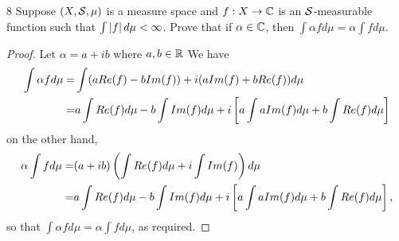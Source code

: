 \begin{exercise}{8}
Suppose $(X, \mathcal{S}, \mu)$ is a measure space and $f: X \to \mathbb{C}$ is an $\mathcal{S}$-measurable function such that $\int \left\lvert f\right\rvert d\mu < \infty$.
Prove that if $\alpha \in \mathbb{C}$, then $\int \alpha f d\mu = \alpha \int f d\mu$.
\end{exercise}
\begin{proof}
Let $\alpha = a + ib$ where $a, b \in \mathbb{R}$
We have
\begin{align*}
    \int \alpha f d\mu
    =& \int (aRe(f) - bIm(f)) + i(aIm(f) + bRe(f)) d\mu\\
    =& a\int Re(f) d\mu - b \int Im(f) d\mu + i \left[ a\int aIm(f) d\mu + b \int Re(f) d\mu\right]
\end{align*}
on the other hand,
\begin{align*}
    \alpha \int f d\mu
    =& (a + ib) \left( \int Re(f) d\mu + i \int Im(f)\right) d\mu\\
    =& a\int Re(f) d\mu - b \int Im(f) d\mu + i \left[ a\int aIm(f) d\mu + b \int Re(f) d\mu\right],
\end{align*}
so that $\int \alpha f d\mu = \alpha \int f d\mu$, as required.
\end{proof} 
